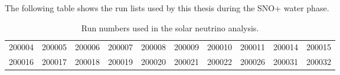The following table shows the run lists used by this thesis during the SNO+ water phase. 

\begin{table}[ht]\label{n16scanTable_zscan}
	\caption[]{Run numbers used in the solar neutrino analysis.}
	\centering
		\begin{tabular*}{160mm}{@{\extracolsep{\fill}}cccccccccc}
		\toprule 
        200004&200005&200006&200007&200008&200009&200010&200011&200014&200015\\
        200016&200017&200018&200019&200020&200021&200022&200026&200031&200032\\
		\bottomrule	
	\end{tabular*}
\end{table}        

 